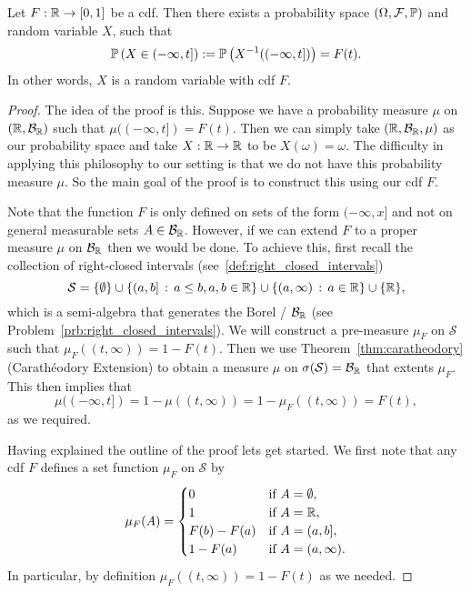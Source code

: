 \begin{theorem}\label{thm:construction_random_variable}
Let $F : \mathbb R \to [0,1]$ be a cdf. Then there exists a probability space  $(\Omega,\mathcal F, \mathbb P)$ and random variable $X$, such that 
\[
	\mathbb P\left(X \in (-\infty,t]\right) := \mathbb P\left(X^{-1}((-\infty,t])\right) = F(t).
\]
In other words, $X$ is a random variable with cdf $F$.
\end{theorem}

\begin{proof}

The idea of the proof is this. Suppose we have a probability measure $\mu$ on $(\mathbb R, \mathcal B_{\mathbb R})$ such that $\mu((-\infty,t]) = F(t)$. Then we can simply take $(\mathbb R, \mathcal B_{\mathbb R}, \mu)$ as our probability space and take $X : \mathbb R \to \mathbb R$ to be $X(\omega) = \omega$. The difficulty in applying this philosophy to our setting is that we do not have this probability measure $\mu$. So the main goal of the proof is to construct this using our cdf $F$. 

Note that the function $F$ is only defined on sets of the form $(-\infty,x]$ and not on general measurable sets $A \in \mathcal B_{\mathbb R}$. However, if we can extend $F$ to a proper measure $\mu$ on $\mathcal B_{\mathbb R}$ then we would be done. To achieve this, first recall the collection of right-closed intervals (see~\eqref{def:right_closed_intervals})
\[
	\mathcal{S} = \{\emptyset\} \cup \{(a,b] \, : \, a \le b, a,b \in \mathbb R\} \cup \{(a, \infty) \, : \, a \in \mathbb R\} \cup \{\mathbb R\},
\] 
which is a semi-algebra that generates the Borel \sigalg/ $\mathcal B_{\mathbb R}$ (see Problem~\ref{prb:right_closed_intervals}). We will construct a pre-measure $\mu_F$ on $\mathcal{S}$ such that $\mu_F((t,\infty)) = 1 - F(t)$. Then we use Theorem~\ref{thm:caratheodory} (Carath\'{e}odory Extension) to obtain a measure $\mu$ on $\sigma(\mathcal{S}) = \mathcal B_{\mathbb R}$ that extents $\mu_F$. This then implies that 
\[
	\mu((-\infty,t]) = 1 - \mu((t,\infty)) = 1 - \mu_F((t,\infty)) = F(t),
\]
as we required. 

Having explained the outline of the proof lets get started. We first note that any cdf $F$ defines a set function $\mu_F$ on $\mathcal{S}$ by
\[
	\mu_F(A) = \begin{cases}
		0 &\text{if } A = \emptyset,\\
		1 &\text{if } A = \mathbb R,\\
		F(b) - F(a) &\text{if } A = (a,b],\\
		1 - F(a) &\text{if } A = (a, \infty).
	\end{cases}
\]
In particular, by definition $\mu_F((t,\infty)) = 1 - F(t)$ as we needed.


\end{proof}
